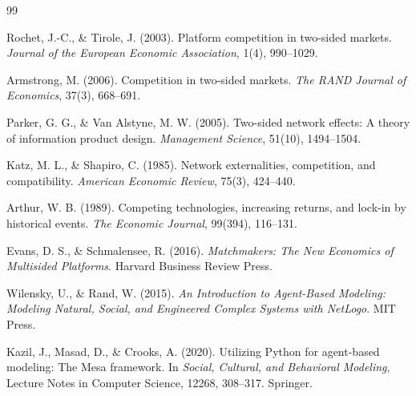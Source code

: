 \documentclass[UTF8,zihao=-4]{ctexart}
\begin{document}
\begin{thebibliography}{99}

Rochet, J.-C., \& Tirole, J. (2003). Platform competition in two-sided markets. \textit{Journal of the European Economic Association}, 1(4), 990--1029.

Armstrong, M. (2006). Competition in two-sided markets. \textit{The RAND Journal of Economics}, 37(3), 668--691.

Parker, G. G., \& Van Alstyne, M. W. (2005). Two-sided network effects: A theory of information product design. \textit{Management Science}, 51(10), 1494--1504.

Katz, M. L., \& Shapiro, C. (1985). Network externalities, competition, and compatibility. \textit{American Economic Review}, 75(3), 424--440.

Arthur, W. B. (1989). Competing technologies, increasing returns, and lock-in by historical events. \textit{The Economic Journal}, 99(394), 116--131.

Evans, D. S., \& Schmalensee, R. (2016). \textit{Matchmakers: The New Economics of Multisided Platforms}. Harvard Business Review Press.

Wilensky, U., \& Rand, W. (2015). \textit{An Introduction to Agent-Based Modeling: Modeling Natural, Social, and Engineered Complex Systems with NetLogo}. MIT Press.

Kazil, J., Masad, D., \& Crooks, A. (2020). Utilizing Python for agent-based modeling: The Mesa framework. In \textit{Social, Cultural, and Behavioral Modeling}, Lecture Notes in Computer Science, 12268, 308--317. Springer.

\end{thebibliography}
\end{document}
